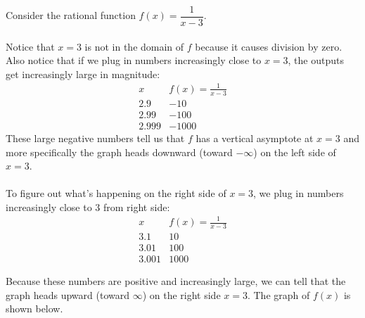 \documentclass{ximera}
\begin{document}

\begin{example}
Consider the rational function $f(x)=\dfrac{1}{x-3}$.
\\
\\Notice that $x=3$ is not in the domain of $f$ because it causes division by zero. Also notice that if we plug in numbers increasingly close to $x=3$, the outputs get increasingly large in magnitude: 
$$ \begin{array}{c|c}
		x       & f(x)=\frac{1}{x-3} \\\hline
		2.9      &  -10\\ 
		2.99     &  -100\\
		2.999    &  -1000
	\end{array} $$
These large negative numbers tell us that $f$ has a vertical asymptote at $x=3$ and more specifically the graph heads downward (toward $-\infty$) on the left side of $x=3$.
\\
\\To figure out what's happening on the right side of $x=3$, we plug in numbers increasingly close to $3$ from right side: 
$$ \begin{array}{c|c}
		x       & f(x)=\frac{1}{x-3} \\\hline
		3.1   &  10\\
		3.01  & 100\\
		3.001 & 1000
	\end{array} $$

Because these numbers are positive and increasingly large, we can tell that the graph heads upward (toward $\infty$) on the right side $x=3$. The graph of $f(x)$ is shown below.

\begin{center}\end{center}
\end{example}
\end{document}
